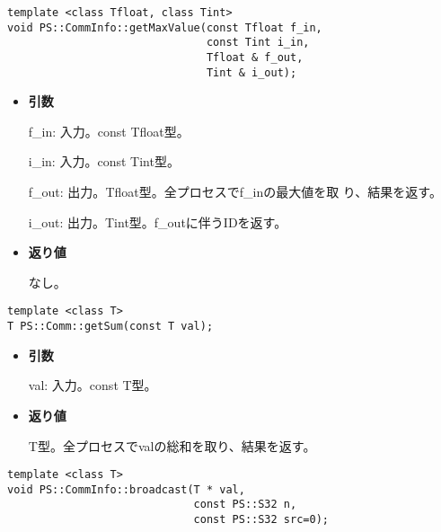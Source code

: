 \begin{screen}
\begin{verbatim}
template <class Tfloat, class Tint>
void PS::CommInfo::getMaxValue(const Tfloat f_in,
                               const Tint i_in,
                               Tfloat & f_out,
                               Tint & i_out);
\end{verbatim}
\end{screen}

\begin{itemize}

\item{{\bf 引数}}

f\_in: 入力。const Tfloat型。

i\_in: 入力。{const Tint}型。

{f\_out}: 出力。{Tfloat}型。全プロセスで{f\_in}の最大値を取
り、結果を返す。

{i\_out}: 出力。{Tint}型。{f\_out}に伴うIDを返す。

\item{{\bf 返り値}}

なし。

\end{itemize}


\begin{screen}
\begin{verbatim}
template <class T>
T PS::Comm::getSum(const T val);
\end{verbatim}
\end{screen}

\begin{itemize}

\item{{\bf 引数}}

{val}: 入力。{const T}型。

\item{{\bf 返り値}}

{T}型。全プロセスで{val}の総和を取り、結果を返す。

\end{itemize}


\begin{screen}
\begin{verbatim}
template <class T>
void PS::CommInfo::broadcast(T * val,
                             const PS::S32 n,
                             const PS::S32 src=0);
\end{verbatim}
\end{screen}

